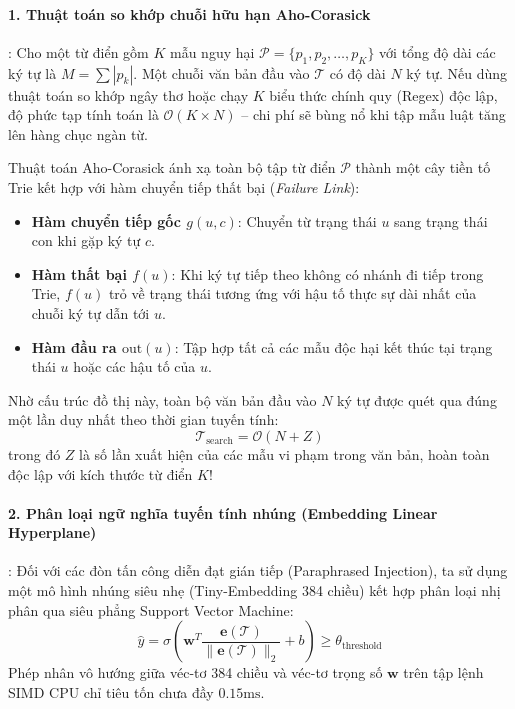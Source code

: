 \paragraph{1. Thuật toán so khớp chuỗi hữu hạn Aho-Corasick}:
Cho một từ điển gồm $K$ mẫu nguy hại $\mathcal{P} = \{p_1, p_2, \dots, p_K\}$ với tổng độ dài các ký tự là $M = \sum |p_k|$. Một chuỗi văn bản đầu vào $\mathcal{T}$ có độ dài $N$ ký tự.
Nếu dùng thuật toán so khớp ngây thơ hoặc chạy $K$ biểu thức chính quy (Regex) độc lập, độ phức tạp tính toán là $\mathcal{O}(K \times N)$ -- chi phí sẽ bùng nổ khi tập mẫu luật tăng lên hàng chục ngàn từ.

Thuật toán Aho-Corasick ánh xạ toàn bộ tập từ điển $\mathcal{P}$ thành một cây tiền tố Trie kết hợp với hàm chuyển tiếp thất bại (\textit{Failure Link}):
\begin{itemize}
  \item \textbf{Hàm chuyển tiếp gốc $g(u, c)$}: Chuyển từ trạng thái $u$ sang trạng thái con khi gặp ký tự $c$.
  \item \textbf{Hàm thất bại $f(u)$}: Khi ký tự tiếp theo không có nhánh đi tiếp trong Trie, $f(u)$ trỏ về trạng thái tương ứng với hậu tố thực sự dài nhất của chuỗi ký tự dẫn tới $u$.
  \item \textbf{Hàm đầu ra $\text{out}(u)$}: Tập hợp tất cả các mẫu độc hại kết thúc tại trạng thái $u$ hoặc các hậu tố của $u$.
\end{itemize}
Nhờ cấu trúc đồ thị này, toàn bộ văn bản đầu vào $N$ ký tự được quét qua đúng một lần duy nhất theo thời gian tuyến tính:
\begin{equation}
\mathcal{T}_{\text{search}} = \mathcal{O}(N + Z)
\end{equation}
trong đó $Z$ là số lần xuất hiện của các mẫu vi phạm trong văn bản, hoàn toàn độc lập với kích thước từ điển $K$!

\paragraph{2. Phân loại ngữ nghĩa tuyến tính nhúng (Embedding Linear Hyperplane)}:
Đối với các đòn tấn công diễn đạt gián tiếp (Paraphrased Injection), ta sử dụng một mô hình nhúng siêu nhẹ (Tiny-Embedding 384 chiều) kết hợp phân loại nhị phân qua siêu phẳng Support Vector Machine:
\begin{equation}
\hat{y} = \sigma\left(\mathbf{w}^T \frac{\mathbf{e}(\mathcal{T})}{\|\mathbf{e}(\mathcal{T})\|_2} + b\right) \ge \theta_{\text{threshold}}
\end{equation}
Phép nhân vô hướng giữa véc-tơ 384 chiều và véc-tơ trọng số $\mathbf{w}$ trên tập lệnh SIMD CPU chỉ tiêu tốn chưa đầy $0.15\text{ms}$.

